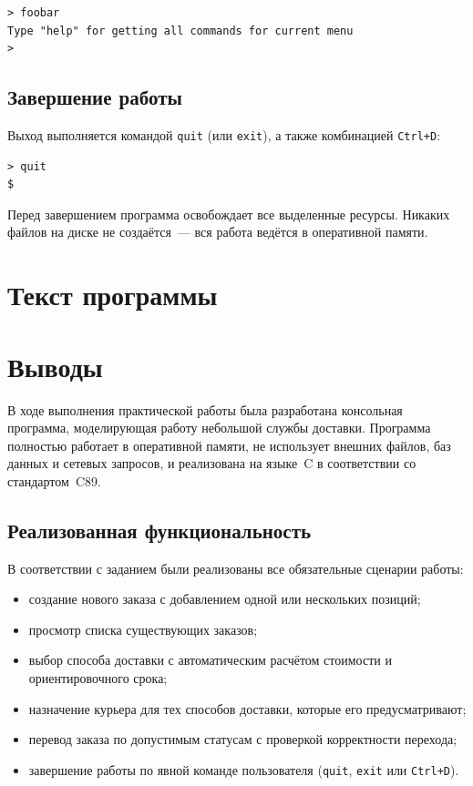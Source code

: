 \documentclass[12pt]{extarticle}
\renewcommand{\baselinestretch}{1.5}
\newcommand{\cmd}[1]{\texttt{#1}}
\begin{document}
\renewcommand{\baselinestretch}{1}
\begin{lstlisting}
> foobar
Type "help" for getting all commands for current menu
>
\end{lstlisting}
\renewcommand{\baselinestretch}{1.5}

\subsection{Завершение работы}

Выход выполняется командой \cmd{quit} (или \cmd{exit}), а также
комбинацией \texttt{Ctrl+D}:

\renewcommand{\baselinestretch}{1}
\begin{lstlisting}
> quit
$
\end{lstlisting}
\renewcommand{\baselinestretch}{1.5}

Перед завершением программа освобождает все выделенные ресурсы.
Никаких файлов на диске не создаётся~--- вся работа ведётся в
оперативной памяти.

\section{Текст программы}
\lstset{style=coolprint}
\renewcommand{\baselinestretch}{1}

\renewcommand{\baselinestretch}{1.5}

\section{Выводы}

В ходе выполнения практической работы была разработана консольная
программа, моделирующая работу небольшой службы доставки. Программа
полностью работает в оперативной памяти, не использует внешних
файлов, баз данных и сетевых запросов, и реализована на языке~C в
соответствии со стандартом~C89.

\subsection*{Реализованная функциональность}

В соответствии с заданием были реализованы все обязательные
сценарии работы:

\begin{itemize}
    \item создание нового заказа с добавлением одной или нескольких
          позиций;
    \item просмотр списка существующих заказов;
    \item выбор способа доставки с автоматическим расчётом стоимости
          и ориентировочного срока;
    \item назначение курьера для тех способов доставки, которые его
          предусматривают;
    \item перевод заказа по допустимым статусам с проверкой
          корректности перехода;
    \item завершение работы по явной команде пользователя
          (\cmd{quit}, \cmd{exit} или \texttt{Ctrl+D}).
\end{itemize}
\end{document}
